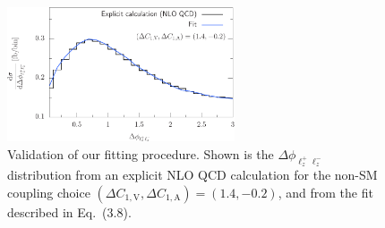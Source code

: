 \documentclass{JHEP3}
\def\DConeA{\Delta C_{1,\mathrm{A}}}
\def\DConeV{\Delta C_{1,\mathrm{V}}}
\begin{document}
\begin{figure}[t]
\centering 
\includegraphics[width=0.6\textwidth]{./LHC_53_Fig17d.pdf}
\caption{\label{fig:iv} Validation of our fitting procedure. Shown is the $\Delta \phi_{\ell^+_z \ell^-_z}$ distribution from an explicit NLO QCD calculation 
for the non-SM coupling choice $(\DConeV,\DConeA)=(1.4,-0.2)$, and from the fit described in Eq.~(3.8). }
\end{figure}
\end{document}
